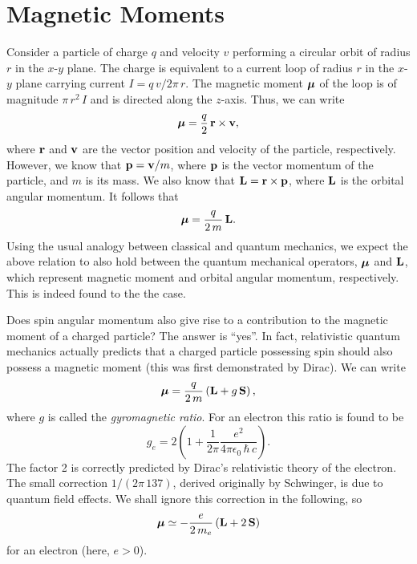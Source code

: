 \section{Magnetic Moments}
Consider a particle of charge $q$ and velocity $v$
performing  a  circular orbit of radius $r$ 
in the $x$-$y$ plane. The charge is equivalent to a current loop of radius $r$
in the $x$-$y$ plane carrying  current $I=q\,v/2\pi\, r$. The magnetic moment
$\mbox{\boldmath$\mu$}$  of
the loop is of magnitude $\pi\,  r^2\, I$ and is directed along the $z$-axis.
Thus, we can write
\begin{equation}
\mbox{\boldmath$\mu$} = \frac{q}{2}\, {\bf r} \times {\bf v},
\end{equation}
where ${\bf r}$ and ${\bf v}$ are the vector position and velocity of the particle,
respectively. However, we know that ${\bf p} = {\bf v} /m$, where ${\bf p}$
is the vector momentum of the particle, and $m$ is its mass. We also know that
${\bf L} = {\bf r}\times {\bf p}$, where ${\bf L}$ is the orbital angular momentum.
It follows that
\begin{equation}
\mbox{\boldmath$\mu$} = \frac{q}{2\,m} \,{\bf L}.
\end{equation}
Using the  usual analogy between classical and quantum mechanics, we 
expect the above relation to also hold between the quantum mechanical operators,
$\mbox{\boldmath$\mu$}$ and ${\bf L}$, which represent magnetic moment and orbital angular momentum,
respectively.
This is indeed found to the the case. 

Does spin angular momentum also give rise to a contribution to the magnetic
moment of a charged particle? The answer is ``yes''. In fact, relativistic quantum
mechanics actually predicts that a charged particle possessing spin should also
possess a magnetic moment (this was first demonstrated by Dirac). We can write
\begin{equation}
\mbox{\boldmath$\mu$}  = \frac{q}{2\,m} \left({\bf L} + g \,{\bf S}\right),
\end{equation}
where $g$ is called the {\em gyromagnetic ratio}. For an electron this ratio
is found to be
\begin{equation}
g_e = 2\left( 1 + \frac{1}{2\pi} \frac{e^2}{4\pi \epsilon_0\,\hbar \,c} \right).
\end{equation}
The factor 2 is correctly predicted by Dirac's relativistic theory of the electron.
The small correction $1/(2\pi\, 137)$, derived  originally by Schwinger, is due to
quantum field effects. We shall ignore this correction in the following,
so
\begin{equation}\label{e5.138}
\mbox{\boldmath$\mu$}  \simeq - \frac{e}{2\,m_e} \left({\bf L} + 2 \,{\bf S}\right)
\end{equation}
for an electron (here, $e>0$).

